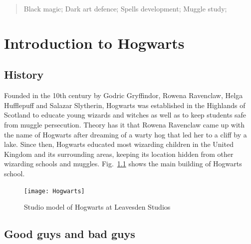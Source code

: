 \documentclass{swfuthesise}
\begin{document}
\maketitle
{}

\begin{abstract}
  \lipsum[1-3]

  \begin{keyword}
    Black magic; Dark art defence; Spells development; Muggle study;
  \end{keyword}
\end{abstract}

\tableofcontents %
\clearpage


\chapter{Introduction to Hogwarts}
\label{cha:intr-hogw}

\section{History}
\label{sec:history}

Founded in the 10th century by Godric Gryffindor, Rowena Ravenclaw, Helga Hufflepuff and
Salazar Slytherin, Hogwarts was established in the Highlands of Scotland to educate young
wizards and witches as well as to keep students safe from muggle
persecution\cite{harrypotter}. Theory has it that Rowena Ravenclaw came up with the name
of Hogwarts after dreaming of a warty hog that led her to a cliff by a lake. Since then,
Hogwarts educated most wizarding children in the United Kingdom and its surrounding areas,
keeping its location hidden from other wizarding schools and
muggles\cite{nla.cat-vn992642,nla.cat-vn7290756}. Fig.~\ref{fig:hogwarts} shows the main building of Hogwarts school.


\begin{figure}
  \centering%
  \texttt{[image: Hogwarts]}
  \caption{Studio model of Hogwarts at Leavesden Studios\label{fig:hogwarts}}
\end{figure}

\lipsum[3-4]

\section{Good guys and bad guys}
\end{document}

